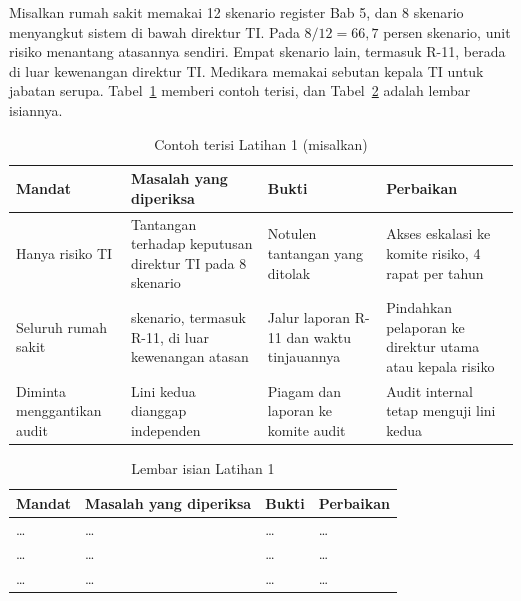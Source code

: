 Misalkan rumah sakit memakai 12 skenario register Bab 5, dan 8 skenario menyangkut sistem di bawah
direktur TI. Pada $8 / 12 = 66{,}7$ persen skenario, unit risiko menantang atasannya sendiri. Empat
skenario lain, termasuk R-11, berada di luar kewenangan direktur TI. Medikara memakai sebutan kepala
TI untuk jabatan serupa. Tabel~\ref{tab:ch12-lat1-contoh} memberi contoh terisi, dan
Tabel~\ref{tab:ch12-lat1-hasil} adalah lembar isiannya.

\begin{table}[!htb]
  \centering\small
  \caption{Contoh terisi Latihan 1 (misalkan)}\label{tab:ch12-lat1-contoh}
  \begin{tabularx}{\textwidth}{|>{\raggedright\arraybackslash}p{}|>{\raggedright\arraybackslash}X|>{\raggedright\arraybackslash}X|>{\raggedright\arraybackslash}X|}
    \hline
    \textbf{Mandat} & \textbf{Masalah yang diperiksa} & \textbf{Bukti} & \textbf{Perbaikan} \\
    \hline
    Hanya risiko TI & Tantangan terhadap keputusan direktur TI pada 8 skenario & Notulen tantangan
    yang ditolak & Akses eskalasi ke komite risiko, 4 rapat per tahun \\ \hline
    Seluruh rumah sakit & 4 skenario, termasuk R-11, di luar kewenangan atasan & Jalur laporan R-11
    dan waktu tinjauannya & Pindahkan pelaporan ke direktur utama atau kepala risiko \\ \hline
    Diminta menggantikan audit & Lini kedua dianggap independen & Piagam dan laporan ke komite
    audit & Audit internal tetap menguji lini kedua \\ \hline
  \end{tabularx}
\end{table}

\begin{table}[!htb]
  \centering\small
  \caption{Lembar isian Latihan 1}\label{tab:ch12-lat1-hasil}
  \begin{tabularx}{\textwidth}{|>{\raggedright\arraybackslash}p{}|>{\raggedright\arraybackslash}X|>{\raggedright\arraybackslash}X|>{\raggedright\arraybackslash}X|}
    \hline
    \textbf{Mandat} & \textbf{Masalah yang diperiksa} & \textbf{Bukti} & \textbf{Perbaikan} \\
    \hline
    \dots & \dots & \dots & \dots \\ \hline
    \dots & \dots & \dots & \dots \\ \hline
    \dots & \dots & \dots & \dots \\ \hline
  \end{tabularx}
\end{table}

